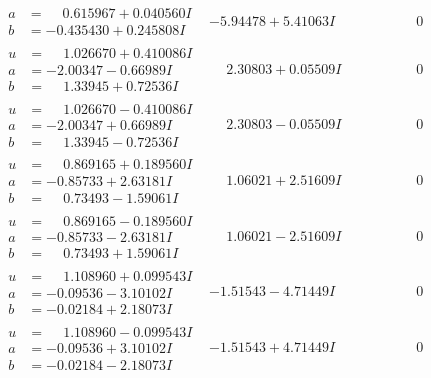 \documentclass[1p]{elsarticle_modified}
\theoremstyle{definition}
\begin{document}
$$\begin{array}{c|c|c}
\begin{aligned}
a &= \phantom{-}0.615967 + 0.040560 I \\
b &= -0.435430 + 0.245808 I\end{aligned}
 & -5.94478 + 5.41063 I & \phantom{-0.000000 } 0 \\ \hline\begin{aligned}
u &= \phantom{-}1.026670 + 0.410086 I \\
a &= -2.00347 - 0.66989 I \\
b &= \phantom{-}1.33945 + 0.72536 I\end{aligned}
 & \phantom{-}2.30803 + 0.05509 I & \phantom{-0.000000 } 0 \\ \hline\begin{aligned}
u &= \phantom{-}1.026670 - 0.410086 I \\
a &= -2.00347 + 0.66989 I \\
b &= \phantom{-}1.33945 - 0.72536 I\end{aligned}
 & \phantom{-}2.30803 - 0.05509 I & \phantom{-0.000000 } 0 \\ \hline\begin{aligned}
u &= \phantom{-}0.869165 + 0.189560 I \\
a &= -0.85733 + 2.63181 I \\
b &= \phantom{-}0.73493 - 1.59061 I\end{aligned}
 & \phantom{-}1.06021 + 2.51609 I & \phantom{-0.000000 } 0 \\ \hline\begin{aligned}
u &= \phantom{-}0.869165 - 0.189560 I \\
a &= -0.85733 - 2.63181 I \\
b &= \phantom{-}0.73493 + 1.59061 I\end{aligned}
 & \phantom{-}1.06021 - 2.51609 I & \phantom{-0.000000 } 0 \\ \hline\begin{aligned}
u &= \phantom{-}1.108960 + 0.099543 I \\
a &= -0.09536 - 3.10102 I \\
b &= -0.02184 + 2.18073 I\end{aligned}
 & -1.51543 - 4.71449 I & \phantom{-0.000000 } 0 \\ \hline\begin{aligned}
u &= \phantom{-}1.108960 - 0.099543 I \\
a &= -0.09536 + 3.10102 I \\
b &= -0.02184 - 2.18073 I\end{aligned}
 & -1.51543 + 4.71449 I & \phantom{-0.000000 } 0 \\ \hline\begin{aligned}

\end{aligned}
\end{array}$$
\end{document}
